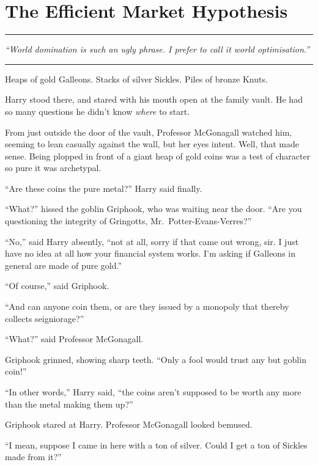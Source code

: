 \chapter{The Efficient Market Hypothesis}

\begin{center}\rule{3in}{0.4pt}\end{center}

\emph{``World domination is such an ugly phrase. I prefer to call it
world optimisation.''}

\begin{center}\rule{3in}{0.4pt}\end{center}

Heaps of gold Galleons. Stacks of silver Sickles. Piles of bronze Knuts.

Harry stood there, and stared with his mouth open at the family vault.
He had so many questions he didn't know \emph{where} to start.

From just outside the door of the vault, Professor McGonagall watched
him, seeming to lean casually against the wall, but her eyes intent.
Well, that made sense. Being plopped in front of a giant heap of gold
coins was a test of character so pure it was archetypal.

``Are these coins the pure metal?'' Harry said finally.

``What?'' hissed the goblin Griphook, who was waiting near the door.
``Are you questioning the integrity of Gringotts,
Mr.~Potter-Evans-Verres?''

``No,'' said Harry absently, ``not at all, sorry if that came out wrong,
sir. I just have no idea at all how your financial system works. I'm
asking if Galleons in general are made of pure gold.''

``Of course,'' said Griphook.

``And can anyone coin them, or are they issued by a monopoly that
thereby collects seigniorage?''

``What?'' said Professor McGonagall.

Griphook grinned, showing sharp teeth. ``Only a fool would trust any but
goblin coin!''

``In other words,'' Harry said, ``the coins aren't supposed to be worth
any more than the metal making them up?''

Griphook stared at Harry. Professor McGonagall looked bemused.

``I mean, suppose I came in here with a ton of silver. Could I get a ton
of Sickles made from it?''

